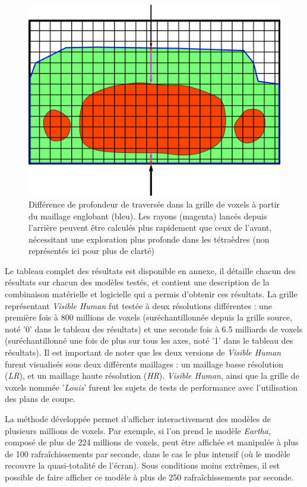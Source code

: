 {{{{			    \begin{figure}[h]
			        \centering
			        \includegraphics[width=.8\linewidth]{img/voxel_raycast_difference.png}
			        \caption{Différence de profondeur de traversée dans la grille de voxels à partir du maillage englobant (bleu). Les rayons (magenta) lancés depuis l'arrière peuvent être calculés plus rapidement que ceux de l'avant, nécessitant une exploration plus profonde dans les tétraèdres (non représentés ici pour plus de clarté)}
			        \label{img:voxel_grid_traversal_difference}
			    \end{figure}
			    
			    Le tableau complet des résultats est disponible en annexe, il détaille chacun des résultats sur chacun des modèles testés, et contient une description de la combinaison matérielle et logicielle qui a permis d'obtenir ces résultats. La grille représentant \textit{Visible Human} fut testée à deux résolutions différentes : une première fois à 800 millions de voxels (suréchantillonnée depuis la grille source, noté '0' dans le tableau des résultats) et une seconde fois à 6.5 milliards de voxels (suréchantillonné une fois de plus sur tous les axes, noté '1' dans le tableau des résultats). Il est important de noter que les deux versions de \textit{Visible Human} furent visualisés sous deux différents maillages : un maillage basse résolution (\textit{LR}), et un maillage haute résolution (\textit{HR}). \textit{Visible Human}, ainsi que la grille de voxels nommée '\textit{Louis}' furent les sujets de tests de performance avec l'utilisation des plans de coupe.
			    
			    La méthode développée permet d'afficher interactivement des modèles de plusieurs millions de voxels. Par exemple, si l'on prend le modèle \textit{Eartha}, composé de plus de 224 millions de voxels, peut être affichée et manipulée à plus de 100 rafraîchissements par seconde, dans le cas le plus intensif (où le modèle recouvre la quasi-totalité de l'écran). Sous conditions moins extrêmes, il est possible de faire afficher ce modèle à plus de 250 rafraîchissements par seconde.
			}
		}

}}
